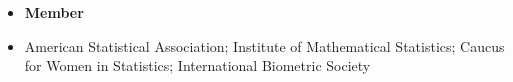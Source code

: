 \documentclass[11pt]{article}
\makeatletter
\newcommand\regsz{\@setfontsize\regsz{12pt}{6}}
\makeatother
\begin{document}
\begin{itemize}
	\item[] \textbf{Member} \vspace{-2mm}
	\item[] American Statistical Association; Institute of Mathematical Statistics; Caucus for Women in Statistics; International Biometric Society
\end{itemize}

%
\end{document}
